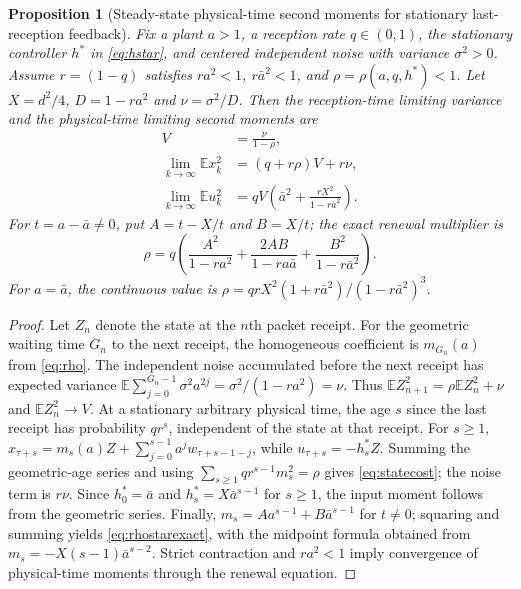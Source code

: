 \documentclass[preprint,12pt,numbers]{elsarticle}
\newtheorem{proposition}{Proposition}
\theoremstyle{definition}
\begin{document}
\begin{proposition}[Steady-state physical-time second moments for stationary last-reception feedback]\label{prop:cost}
Fix a plant $a>1$, a reception rate $q\in(0,1)$, the stationary controller $h^*$ in \eqref{eq:hstar}, and centered independent noise with variance $\sigma^2>0$. Assume $r=(1-q)$ satisfies $ra^2<1$, $r\bar a^2<1$, and $\rho=\rho(a,q,h^*)<1$. Let $X=d^2/4$, $D=1-ra^2$ and $\nu=\sigma^2/D$. Then the reception-time limiting variance and the physical-time limiting second moments are
\begin{align}
V&=\frac{\nu}{1-\rho},\label{eq:arrcost}\\
\lim_{k\to\infty}\mathbb E x_k^2&=(q+r\rho)V+r\nu,\label{eq:statecost}\\
\lim_{k\to\infty}\mathbb E u_k^2&=qV\left(\bar a^2+\frac{rX^2}{1-r\bar a^2}\right).\label{eq:inputcost}
\end{align}
For $t=a-\bar a\neq0$, put $A=t-X/t$ and $B=X/t$; the exact renewal multiplier is
\begin{equation}\label{eq:rhostarexact}
\rho=q\left(\frac{A^2}{1-ra^2}+\frac{2AB}{1-ra\bar a}+\frac{B^2}{1-r\bar a^2}\right).
\end{equation}
For $a=\bar a$, the continuous value is $\rho=qrX^2(1+r\bar a^2)/(1-r\bar a^2)^3$.
\end{proposition}
\begin{proof}
Let $Z_n$ denote the state at the $n$th packet receipt. For the geometric waiting time $G_n$ to the next receipt, the homogeneous coefficient is $m_{G_n}(a)$ from \eqref{eq:rho}. The independent noise accumulated before the next receipt has expected variance
$\mathbb E\sum_{j=0}^{G_n-1}\sigma^2a^{2j}=\sigma^2/(1-ra^2)=\nu$.
Thus $\mathbb E Z_{n+1}^2=\rho\mathbb E Z_n^2+\nu$ and $\mathbb E Z_n^2\to V$. At a stationary arbitrary physical time, the age $s$ since the last receipt has probability $qr^s$, independent of the state at that receipt. For $s\ge1$, $x_{\tau+s}=m_s(a)Z+\sum_{j=0}^{s-1}a^jw_{\tau+s-1-j}$, while $u_{\tau+s}=-h_s^*Z$. Summing the geometric-age series and using $\sum_{s\ge1}qr^{s-1}m_s^2=\rho$ gives \eqref{eq:statecost}; the noise term is $r\nu$. Since $h_0^*=\bar a$ and $h_s^*=X\bar a^{s-1}$ for $s\ge1$, the input moment follows from the geometric series. Finally, $m_s=Aa^{s-1}+B\bar a^{s-1}$ for $t\neq0$; squaring and summing yields \eqref{eq:rhostarexact}, with the midpoint formula obtained from $m_s=-X(s-1)\bar a^{s-2}$. Strict contraction and $ra^2<1$ imply convergence of physical-time moments through the renewal equation.\end{proof}
\end{document}
